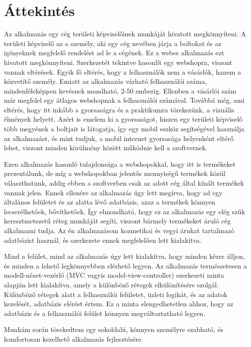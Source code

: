 \section{Áttekintés}
Az alkalmazás egy cég területi képviselőinek munkáját hivatott megkönnyíteni. A területi képviselő az a személy, aki egy cég nevében járja a boltokat és az igényeknek megfelelő rendelést ad le a cégének. Ez a webes alkalmazás ezt hivatott megkönnyíteni. Szerkezetét tekintve hasonlít egy webshopra, viszont vannak eltérések. Egyik fő eltérés, hogy a felhasználók nem a vásárlók, hanem a közvetítő személy. Emiatt az alkalmazás várható felhasználói száma, mindenféleképpen kevésnek mondható, 2-50 emberig. Ellenben a vásárlói szám már megfelel egy átlagos webshopnak a felhasználói számával. Továbbá még, ami eltérés, hogy itt inkább a gyorsaságra és a praktikumra törekszünk, a vizuális élmények helyett. Azért is emelem ki a gyorsaságot, hiszen egy területi képviselő több megyének a boltjait is látogatja, így egy mobil eszköz segítségével használja az alkalmazást, és mint tudjuk, a mobil internet gyorsasága helyenként eltérő lehet, viszont minden körülmény között működnie kell a szoftvernek.

Ezen alkalmazás hasonló tulajdonsága a webshopokkal, hogy itt is termékeket prezentálunk, de míg a webshopokban jelentős mennyiségű termékek közül választhatunk, addig ebben a szoftverben csak az adott cég által kínált termékek vannak jelen. Ennek ellenére az alkalmazás úgy lett megírva, hogy ad egy általános felületet és az alatta lévő adatbázis, azaz a termékek könnyen lecserélhetőek, bővíthetőek. Így elmondható, hogy ez az alkalmazás egy elég szűk keresztmetszetű réteg munkáját segíti, viszont bármely termékeket áruló cég alkalmazni tudja. Az én alkalmazásom kozmetikai és vegyi árukat tartalmazó adatbázist használ, és szerkezete ennek megfelelően lett kialakítva. 

Mind a felület, mind az alkalmazás úgy lett kialakítva, hogy minden kézre álljon, és minden a lehető legkönnyebben elérhető legyen. Az alkalmazás természetesen a modell-nézet-vezérlő (MVC vagyis model-view-controller) szerkezeti minta alapján lett kialakítva, amely a különböző rétegek elkülönítésére szolgál. Különböző rétegek alatt a felhasználói felületet, üzleti logikát, és az adatok kezelését, adatbázis elérést értem. Ez a minta elengedhetetlen ahhoz, hogy az adatbázis és a felhasználói felület könnyen megváltoztatható legyen.

Munkám során törekedtem egy sokoldalú, könnyen személyre szabható, és komfortosan kezelhető alkalmazás fejlesztésére. 
